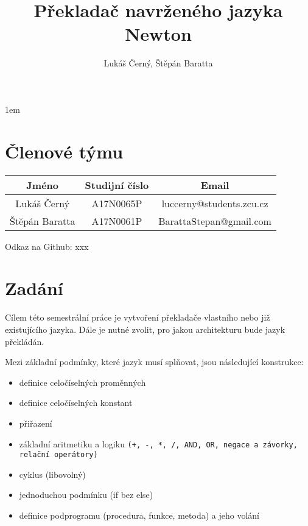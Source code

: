 \documentclass{style}
\author{Lukáš Černý, Štěpán Baratta}
\title{Překladač navrženého jazyka Newton}
\begin{document}
\pagestyle{fancy}
\renewcommand{\chaptermark}[1]{\markboth{\textit{#1}}{}}
\renewcommand{\sectionmark}[1]{\markright{\textit{#1}}{}}
\cfoot{\thepage}
\lhead{\leftmark}
\rhead{\rightmark}
\maketitle

\tableofcontents
\pagestyle{fancy}
\renewcommand{\chaptermark}[1]{\markboth{\textit{#1}}{}}
\renewcommand{\sectionmark}[1]{\markright{\textit{#1}}{}}
\cfoot{\thepage}
\lhead{\leftmark}
\rhead{\rightmark}
\parskip 1em

\chapter{Členové týmu}

\begin{table}[h]
\centering
\begin{tabular}{c|c|c}
Jméno & Studijní číslo & Email \\
\hline
Lukáš Černý & A17N0065P & luccerny@students.zcu.cz \\
Štěpán Baratta & A17N0061P & BarattaStepan@gmail.com \\
\end{tabular}
\end{table}

Odkaz na Github: xxx

\chapter{Zadání}
Cílem této semestrální práce je vytvoření překladače vlastního nebo již existujícího jazyka. Dále je nutné zvolit, pro jakou architekturu bude jazyk překládán.

Mezi základní podmínky, které jazyk musí splňovat, jsou následující konstrukce:

\begin{itemize}
\item definice celočíselných proměnných \\
\item definice celočíselných konstant \\
\item přiřazení \\
\item základní aritmetiku a logiku \verb|(+, -, *, /, AND, OR, negace a závorky, relační operátory)| \\
\item cyklus (libovolný) \\
\item jednoduchou podmínku (if bez else) \\
\item definice podprogramu (procedura, funkce, metoda) a jeho volání \\
\end{itemize}
\end{document}
